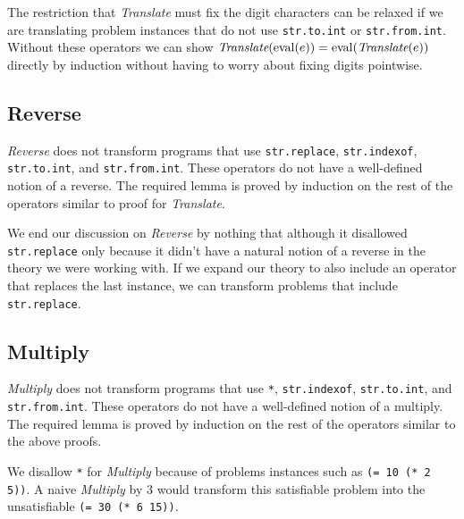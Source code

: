 The restriction that \textit{Translate} must fix the digit characters can be
relaxed if we are translating problem instances that do not use
\texttt{str.to.int} or \texttt{str.from.int}. Without these operators we can
show $\textit{Translate}(\operatorname{eval} (e)) = \operatorname{eval} (\textit{Translate}(e))$ directly by
induction without having to worry about fixing digits pointwise.

\subsection{Reverse}
\textit{Reverse} does not transform programs that use \texttt{str.replace},
\texttt{str.indexof}, \texttt{str.to.int}, and \texttt{str.from.int}. These
operators do not have a well-defined notion of a reverse. The required lemma is
proved by induction on the rest of the operators similar to proof for
\textit{Translate}.

We end our discussion on \textit{Reverse} by nothing that although it disallowed
\texttt{str.replace} only because it didn't have a natural notion of a reverse
in the theory we were working with. If we expand our theory to also include an
operator that replaces the last instance, we can transform problems that include
\texttt{str.replace}.

\subsection{Multiply}
\textit{Multiply} does not transform programs that use \texttt{*},
\texttt{str.indexof}, \texttt{str.to.int}, and \texttt{str.from.int}. These
operators do not have a well-defined notion of a multiply. The required lemma is
proved by induction on the rest of the operators similar to the above proofs.

We disallow \texttt{*} for \textit{Multiply} because of problems instances such
as \texttt{(= 10 (* 2 5))}. A naive \textit{Multiply} by $3$ would transform
this satisfiable problem into the unsatisfiable \texttt{(= 30 (* 6 15))}.
